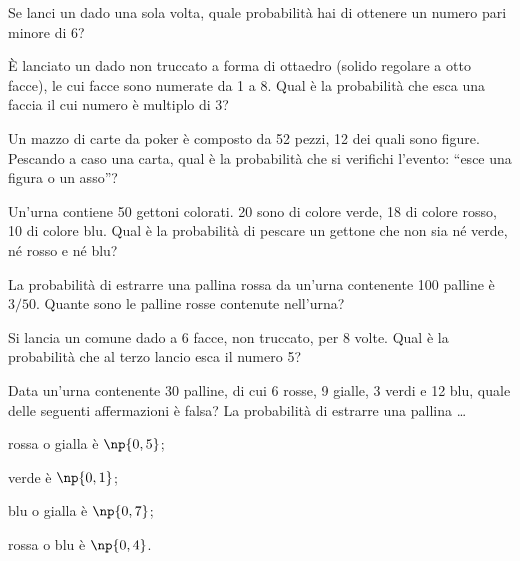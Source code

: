 \begin{esercizio}[2006~\Ast]
\label{ese:9.67}
Se lanci un dado una sola volta, quale probabilità hai di ottenere un numero pari minore di 6?
\end{esercizio}

\begin{esercizio}[2006~\Ast]
\label{ese:9.68}
È lanciato un dado non truccato a forma di ottaedro (solido regolare a otto facce), le cui facce sono numerate da 1 a 8. Qual è la probabilità che esca una faccia il cui numero è multiplo di 3?
\end{esercizio}

\begin{esercizio}[2006~\Ast]
\label{ese:9.69}
Un mazzo di carte da poker è composto da 52 pezzi, 12 dei quali sono figure. Pescando a caso una carta, qual è la probabilità che si verifichi l'evento: ``esce una figura o un asso''?
\end{esercizio}

\begin{esercizio}[2006~\Ast]
\label{ese:9.70}
Un'urna contiene 50 gettoni colorati. 20 sono di colore verde, 18 di colore rosso, 10 di colore blu. Qual è la probabilità di pescare un gettone che non sia né verde, né rosso e né blu?
\end{esercizio}

\begin{esercizio}[2006~\Ast]
\label{ese:9.71}
La probabilità di estrarre una pallina rossa da un'urna contenente 100 palline è $3/50$. Quante sono le palline rosse contenute nell'urna?
\end{esercizio}

\begin{esercizio}[2005~\Ast]
\label{ese:9.72}
Si lancia un comune dado a 6 facce, non truccato, per 8 volte. Qual è la probabilità che al terzo lancio esca il numero 5?
\end{esercizio}

\begin{esercizio}[2005~\Ast]
\label{ese:9.73}
Data un'urna contenente 30 palline, di cui 6 rosse, 9 gialle, 3 verdi e 12 blu, quale delle seguenti affermazioni è falsa? La probabilità di estrarre una pallina \ldots
\begin{multicols}{2}
\begin{enumeratea}
\item rossa o gialla è $\np{0,5}$;
\item verde è $\np{0,1}$;
\item blu o gialla è $\np{0,7}$;
\item rossa o blu è $\np{0,4}$.
\end{enumeratea}
\end{multicols}
\end{esercizio}

